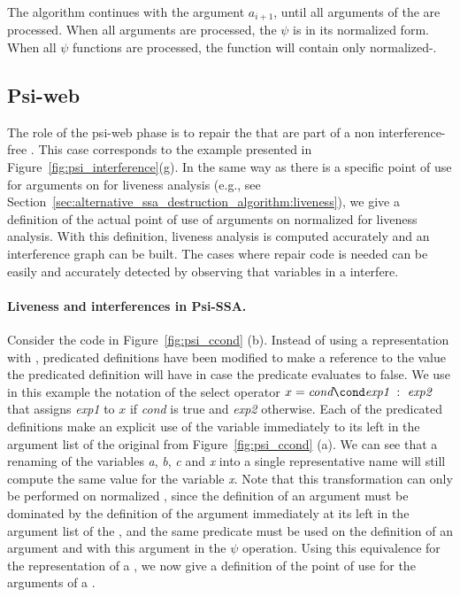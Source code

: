 The algorithm continues with the argument ${a_{i+1}}$, until all
arguments of the \psifun are processed. When all arguments
are processed, the $\psi$ is in its normalized form. When all $\psi$
functions are processed, the function will contain only
normalized-\psifuns.


\subsection{Psi-web}
\index{\psiweb}
The role of the psi-web phase is to repair the \psifuns that are part of a non interference-free \psiweb. 
This case corresponds to the example presented in
Figure~\ref{fig:psi_interference}(g).
%
In the same way as there is a specific point of use for arguments on
\phifuns for liveness analysis (e.g., see Section~\ref{sec:alternative_ssa_destruction_algorithm:liveness}), we give a definition of the
actual point of use of arguments on normalized \psifuns for liveness
analysis. With this definition, liveness analysis is computed
accurately and an interference graph can be built. The cases where repair code is needed can be easily and
accurately detected by observing that variables in a
\psifun interfere.

\paragraph{Liveness and interferences in Psi-SSA.}
Consider the code in Figure~\ref{fig:psi_ccond} (b). Instead of using
a representation with \psifuns, predicated definitions have
been modified to make a reference to the value the predicated
definition will have in case the predicate evaluates to false. We use in this
example the notation of the select operator
$x = \textit{cond}\cond \textit{exp1}~:~\textit{exp2}$ that assigns \textit{exp1} to $x$ if \textit{cond} is true and \textit{exp2} otherwise. 
Each of the predicated definitions make an
explicit use of the variable immediately to its left in the argument
list of the original \psifun from Figure~\ref{fig:psi_ccond}
(a). We can see that a renaming of the variables \textit{a}, \textit{b},
\textit{c} and \textit{x} into a single representative name will still
compute the same value for the variable \textit{x}. Note that this
transformation can only be performed on normalized \psifuns,
since the definition of an argument must be dominated by the
definition of the argument immediately at its left in the argument
list of the \psifun, and the same predicate must be used on the
 definition of an argument and with this argument in the $\psi$ operation.
Using this equivalence for the
representation of a \psifun, we now give a definition of the
point of use for the arguments of a \psifun.


